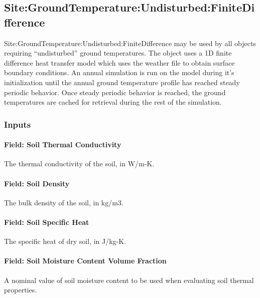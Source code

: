 \subsection{Site:GroundTemperature:Undisturbed:FiniteDifference}\label{sitegroundtemperatureundisturbedfinitedifference}

Site:GroundTemperature:Undisturbed:FiniteDifference may be used by all objects requiring ``undisturbed'' ground temperatures. The object uses a 1D finite difference heat transfer model which uses the weather file to obtain surface boundary conditions. An annual simulation is run on the model during it's initialization until the annual ground temperature profile has reached steady periodic behavior. Once steady periodic behavior is reached, the ground temperatures are cached for retrieval during the rest of the simulation.

\subsubsection{Inputs}\label{inputs-14-007}

\paragraph{Field: Soil Thermal Conductivity}\label{field-soil-thermal-conductivity-000}

The thermal conductivity of the soil, in W/m-K.

\paragraph{Field: Soil Density}\label{field-soil-density-000}

The bulk density of the soil, in kg/m3.

\paragraph{Field: Soil Specific Heat}\label{field-soil-specific-heat-000}

The specific heat of dry soil, in J/kg-K.

\paragraph{Field: Soil Moisture Content Volume Fraction}\label{field-soil-moisture-content-volume-fraction}

A nominal value of soil moisture content to be used when evaluating soil thermal properties.

